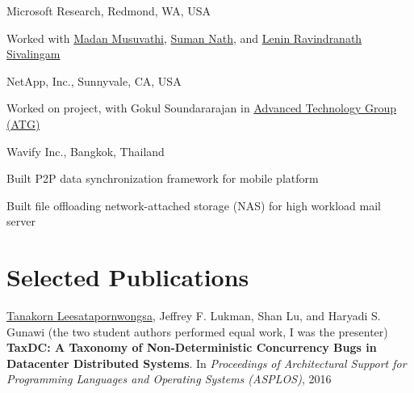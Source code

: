 \documentclass[10pt]{article} %
\begin{document}
{Microsoft Research, Redmond, WA, USA}
{\begin{minipage}{\smallertextwidth}
Worked
with \href{https://www.microsoft.com/en-us/research/people/madanm/}{Madan Musuvathi}, 
\href{https://www.microsoft.com/en-us/research/people/sumann/}{Suman Nath}, 
and \href{http://people.csail.mit.edu/lenin/}{Lenin Ravindranath Sivalingam}
\end{minipage}} 


{NetApp, Inc., Sunnyvale, CA, USA}
{\begin{minipage}{\smallertextwidth}
Worked on  project, 
with Gokul Soundararajan
in \href{http://www.netapp.com/us/company/leadership/advanced-technology/}{Advanced Technology Group (ATG)} 
\end{minipage}}


{Wavify Inc., Bangkok, Thailand}
{\begin{minipage}{\smallertextwidth}
\begin{itemize-noindent}
\setlength\itemsep{-1ex}
\item Built P2P data synchronization framework for mobile platform
\item Built file offloading network-attached storage (NAS) for high workload mail server
\end{itemize-noindent}
\end{minipage}}


\section{Selected Publications}
\underline{Tanakorn Leesatapornwongsa}, Jeffrey F. Lukman, Shan Lu, and Haryadi
S. Gunawi (the two student authors performed equal work, I was the presenter)
\textbf{TaxDC: A Taxonomy of Non-Deterministic Concurrency Bugs in Datacenter
Distributed Systems}. In \textit{Proceedings of Architectural Support for
Programming Languages and Operating Systems (ASPLOS)}, 2016 
\vspace{2mm}
\end{document}
